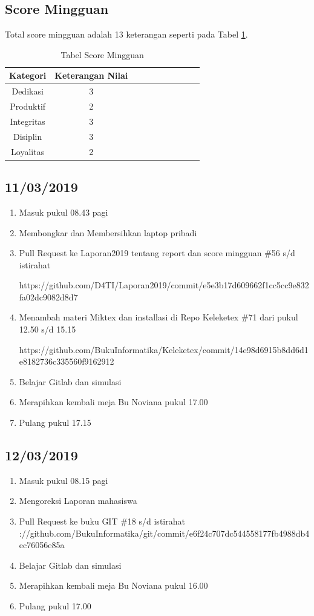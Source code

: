 \subsection{Score Mingguan}
Total score mingguan adalah 13 keterangan seperti pada Tabel \ref{table:scoremingguan1}.
\begin{table}[!ht]
\centering
\begin{tabular}{ |c|c|c|c|c|c|c|c|c|c| }
\hline
Kategori & Keterangan Nilai \\
\hline
Dedikasi & 3 \\
\hline
Produktif & 2 \\
\hline
Integritas & 3 \\
\hline
Disiplin & 3 \\
\hline
Loyalitas & 2 \\
\hline
\end{tabular}
\caption{Tabel Score Mingguan}
\label{table:scoremingguan1}
\end{table}

\subsection{11/03/2019}
\begin{enumerate}
  \item Masuk pukul 08.43 pagi
  \item Membongkar dan Membersihkan laptop pribadi
  \item Pull Request ke Laporan2019 tentang report dan score mingguan \#56 s/d istirahat
\par https://github.com/D4TI/Laporan2019/commit/e5e3b17d609662f1cc5cc9e832fa02dc9082d8d7
  \item Menambah materi Miktex dan installasi di Repo Keleketex \#71 dari pukul 12.50 s/d 15.15
\par https://github.com/BukuInformatika/Keleketex/commit/14e98d6915b8dd6d1e8182736c335560f9162912
  \item Belajar Gitlab dan simulasi
  \item Merapihkan kembali meja Bu Noviana pukul 17.00
  \item Pulang pukul 17.15
\end{enumerate}

\subsection{12/03/2019}
\begin{enumerate}
  \item Masuk pukul 08.15 pagi
  \item Mengoreksi Laporan mahasiswa
  \item Pull Request ke buku GIT  \#18 s/d istirahat
\parhttps://github.com/BukuInformatika/git/commit/e6f24c707dc544558177fb4988db4ec76056e85a
  \item Belajar Gitlab dan simulasi
  \item Merapihkan kembali meja Bu Noviana pukul 16.00
  \item Pulang pukul 17.00
\end{enumerate}

